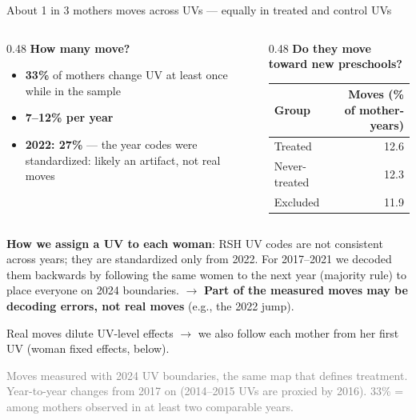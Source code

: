 \documentclass[aspectratio=169,10pt]{beamer}
\newcommand{\fuente}[1]{\vspace{2pt}\textcolor{graytext}{\scriptsize #1}}
\newcommand{\takeaway}[1]{\par\vspace{6pt}{\small\textcolor{steel}{$\Rightarrow$}\ \textbf{\textcolor{navy}{#1}}}}
\begin{document}
\begin{frame}{About 1 in 3 mothers moves across UVs --- equally in treated and control UVs}
\begin{columns}[T]
\begin{column}{0.48\textwidth}
{\small\textcolor{steel}{\textbf{How many move?}}}
\begin{itemize}
  \footnotesize
  \item \textbf{33\%} of mothers change UV at least once while in the sample
  \item \textbf{7--12\% per year}
  \item \textbf{2022: 27\%} --- the year codes were standardized: likely an artifact, not real moves
\end{itemize}
\end{column}
\begin{column}{0.48\textwidth}
{\small\textcolor{steel}{\textbf{Do they move toward new preschools?}}}
\vspace{4pt}
\begin{center}
\footnotesize
\begin{tabular}{@{}lr@{}}
\toprule
Group & Moves (\% of mother-years) \\
\midrule
Treated & 12.6 \\
Never-treated & 12.3 \\
Excluded & 11.9 \\
\bottomrule
\end{tabular}
\end{center}
\end{column}
\end{columns}

\vspace{6pt}
\colorbox{bgpanel}{\parbox{0.97\linewidth}{\raggedright\footnotesize
\textbf{How we assign a UV to each woman}: RSH UV codes are not consistent across years; they are standardized only from 2022. For 2017--2021 we decoded them backwards by following the same women to the next year (majority rule) to place everyone on 2024 boundaries. $\to$ \textbf{Part of the measured moves may be decoding errors, not real moves} (e.g., the 2022 jump).}}

\vspace{3pt}
{\footnotesize Real moves dilute UV-level effects $\to$ we also follow each mother from her first UV (woman fixed effects, below).}
\takeaway{Mothers move often, but not toward UVs that open a preschool.}
\par\fuente{Moves measured with 2024 UV boundaries, the same map that defines treatment. Year-to-year changes from 2017 on (2014--2015 UVs are proxied by 2016). 33\% = among mothers observed in at least two comparable years.}
\end{frame}
\end{document}
